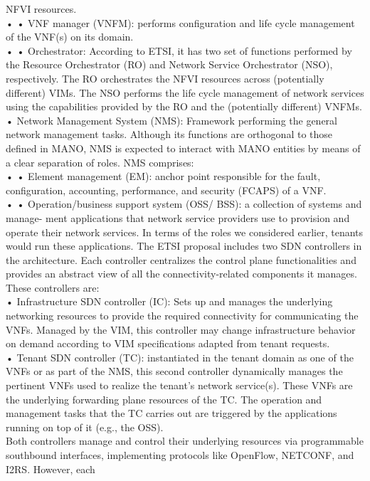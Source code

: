 \documentclass{article}
\begin{document}
NFVI resources.\\
• • VNF manager (VNFM): performs configuration and life cycle management of the
VNF(s) on its domain.\\
• • Orchestrator: According to ETSI, it has two
set of functions performed by the Resource
Orchestrator (RO) and Network Service
Orchestrator (NSO), respectively. The RO
orchestrates the NFVI resources across
(potentially different) VIMs. The NSO performs the life cycle management of network
services using the capabilities provided by the
RO and the (potentially different) VNFMs.\\
• Network Management System (NMS): Framework performing the general network management tasks. Although its functions are orthogonal
to those defined in MANO, NMS is expected to
interact with MANO entities by means of a clear
separation of roles. NMS comprises:\\
• • Element management (EM): anchor point
responsible for the fault, configuration,
accounting, performance, and security
(FCAPS) of a VNF.\\
• • Operation/business support system (OSS/
BSS): a collection of systems and manage-
ment applications that network service providers use to provision and operate their network
services. In terms of the roles we considered
earlier, tenants would run these applications.
The ETSI proposal includes two SDN controllers
in the architecture. Each controller centralizes
the control plane functionalities and provides an
abstract view of all the connectivity-related components it manages. These controllers are:\\
• Infrastructure SDN controller (IC): Sets up
and manages the underlying networking resources to provide the required connectivity for communicating the VNFs.
Managed by the VIM, this controller may change
infrastructure behavior on demand according to
VIM specifications adapted from tenant requests.\\
• Tenant SDN controller (TC): instantiated in
the tenant domain as one of the VNFs or as
part of the NMS, this second controller dynamically manages the pertinent VNFs used to realize
the tenant’s network service(s). These VNFs are
the underlying forwarding plane resources of the
TC. The operation and management tasks that the
TC carries out are triggered by the applications
running on top of it (e.g., the OSS).\\
Both controllers manage and control their
underlying resources via programmable southbound interfaces, implementing protocols like
OpenFlow, NETCONF, and I2RS. However, each
\end{document}
